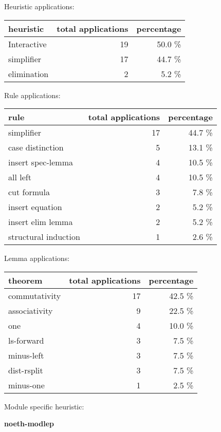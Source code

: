 \documentclass[a4paper]{article}
\begin{document}
\medskip


Heuristic applications:

\begin{supertabular}{l|r|r}
heuristic	& total applications & percentage \\ \hline
Interactive & 19 & 50.0 \% \\
simplifier & 17 & 44.7 \% \\
elimination & 2 & 5.2 \% \\

\end{supertabular}

Rule applications:

\begin{supertabular}{l|r|r}
rule	        & total applications & percentage \\ \hline
simplifier & 17 & 44.7 \% \\
case distinction & 5 & 13.1 \% \\
insert spec-lemma & 4 & 10.5 \% \\
all left & 4 & 10.5 \% \\
cut formula & 3 & 7.8 \% \\
insert equation & 2 & 5.2 \% \\
insert elim lemma & 2 & 5.2 \% \\
structural induction & 1 & 2.6 \% \\

\end{supertabular}

Lemma applications:

\begin{supertabular}{l|r|r}
theorem	        & total applications & percentage \\ \hline
commutativity & 17 & 42.5 \% \\
associativity & 9 & 22.5 \% \\
one & 4 & 10.0 \% \\
ls-forward & 3 & 7.5 \% \\
minus-left & 3 & 7.5 \% \\
dist-rsplit & 3 & 7.5 \% \\
minus-one & 1 & 2.5 \% \\

\end{supertabular}

Module specific heuristic:

\pagebreak

{\LARGE\bf noeth-modlep}\label{lemma-noeth-modlep}
\end{document}
